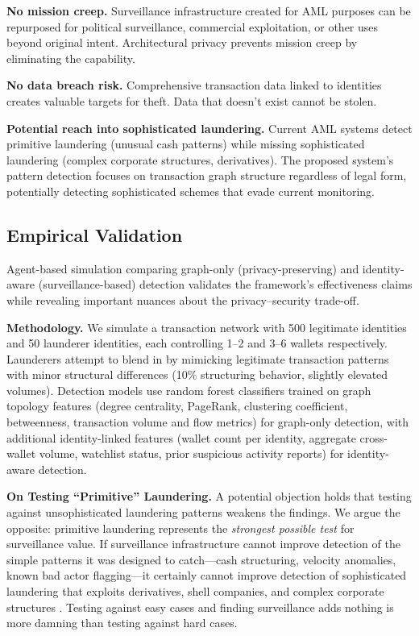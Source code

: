 \documentclass[11pt]{article}
\begin{document}
\textbf{No mission creep.} Surveillance infrastructure created for AML purposes can be repurposed for political surveillance, commercial exploitation, or other uses beyond original intent. Architectural privacy prevents mission creep by eliminating the capability.

\textbf{No data breach risk.} Comprehensive transaction data linked to identities creates valuable targets for theft. Data that doesn't exist cannot be stolen.

\textbf{Potential reach into sophisticated laundering.} Current AML systems detect primitive laundering (unusual cash patterns) while missing sophisticated laundering (complex corporate structures, derivatives). The proposed system's pattern detection focuses on transaction graph structure regardless of legal form, potentially detecting sophisticated schemes that evade current monitoring.

\subsection{Empirical Validation}

Agent-based simulation comparing graph-only (privacy-preserving) and identity-aware (surveillance-based) detection validates the framework's effectiveness claims while revealing important nuances about the privacy--security trade-off.

\textbf{Methodology.} We simulate a transaction network with 500 legitimate identities and 50 launderer identities, each controlling 1--2 and 3--6 wallets respectively. Launderers attempt to blend in by mimicking legitimate transaction patterns with minor structural differences (10\% structuring behavior, slightly elevated volumes). Detection models use random forest classifiers trained on graph topology features (degree centrality, PageRank, clustering coefficient, betweenness, transaction volume and flow metrics) for graph-only detection, with additional identity-linked features (wallet count per identity, aggregate cross-wallet volume, watchlist status, prior suspicious activity reports) for identity-aware detection.

\textbf{On Testing ``Primitive'' Laundering.} A potential objection holds that testing against unsophisticated laundering patterns weakens the findings. We argue the opposite: primitive laundering represents the \textit{strongest possible test} for surveillance value. If surveillance infrastructure cannot improve detection of the simple patterns it was designed to catch---cash structuring, velocity anomalies, known bad actor flagging---it certainly cannot improve detection of sophisticated laundering that exploits derivatives, shell companies, and complex corporate structures \citep{farzulla2025hedging}. Testing against easy cases and finding surveillance adds nothing is more damning than testing against hard cases.
\end{document}
